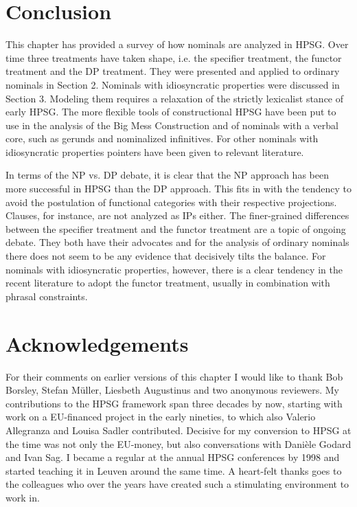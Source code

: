 \documentclass[output=paper
                ,modfonts
                ,nonflat
	        ,collection
	        ,collectionchapter
	        ,collectiontoclongg
 	        ,biblatex
                ,babelshorthands
                ,newtxmath
                ,draftmode
                ,colorlinks, citecolor=brown
]{./langsci/langscibook}
\begin{document}
\section{Conclusion} 


This chapter has provided a survey of how nominals are analyzed in HPSG. 
Over time three treatments have taken shape, i.e. the specifier treatment, 
the functor treatment and the DP treatment. They were presented and applied to ordinary 
nominals in Section 2. Nominals with idiosyncratic properties were discussed in Section 3.
Modeling them requires a relaxation of the strictly lexicalist stance of early HPSG.  
The more flexible tools of constructional HPSG have been put to use in the analysis 
of the Big Mess Construction and of nominals with a verbal core, such as gerunds and 
nominalized infinitives. For other nominals with idiosyncratic properties pointers 
have been given to relevant literature. 

In terms of the NP vs. DP debate, it is clear that the NP approach has been 
more successful in HPSG than the DP approach. This fits in with the tendency to 
avoid the postulation of functional categories with their respective projections. 
Clauses, for instance, are not analyzed as IPs either. The finer-grained 
differences between the specifier treatment and the functor treatment are 
a topic of ongoing debate. They both have their advocates and for the analysis of 
ordinary nominals there does not seem to be any evidence that decisively tilts the balance. 
For nominals with idiosyncratic properties, however, there is a clear tendency in the recent 
literature to adopt the functor treatment, usually in combination with phrasal constraints.    


 
\section*{Acknowledgements}


For their comments on earlier versions of this chapter I would like to thank Bob Borsley, Stefan
Müller, Liesbeth Augustinus and two anonymous reviewers. My contributions to the HPSG framework span
three decades by now, starting with work on a EU-financed project in the early nineties, to which
also Valerio Allegranza and Louisa Sadler contributed. Decisive for my conversion to HPSG at the
time was not only the EU-money, but also conversations with Dani\`ele Godard and Ivan Sag. I became
a regular at the annual HPSG conferences by 1998 and started teaching it in Leuven around the same
time. A heart-felt thanks goes to the colleagues who over the years have created such a stimulating
environment to work in.        


{\sloppy
\printbibliography[heading=subbibliography,notkeyword=this] 
}
\end{document}
